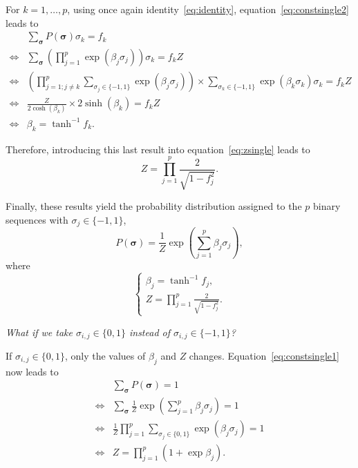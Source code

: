 \documentclass[12pt]{article}
\begin{document}
  For $k = 1, \dots, p$, using once again identity~\eqref{eq:identity},
  equation~\eqref{eq:constsingle2} leads to
  \begin{equation}
    \begin{split}
      &\sum_{\bm{\sigma}} P(\bm{\sigma}) \sigma_k = f_k\\
      \iff& \sum_{\bm{\sigma}} \left(\prod_{j = 1}^p\exp(\beta_j
        \sigma_j)\right) \sigma_k = f_k Z\\
      \iff& \left(\prod_{j = 1; j\neq k}^p \sum_{\sigma_j\in\{-1, 1\}}
        \exp(\beta_j \sigma_j)\right) \times \sum_{\sigma_k\in\{-1, 1\}}
        \exp(\beta_k \sigma_k) \sigma_k = f_k Z\\
      \iff& \frac{Z}{2 \cosh(\beta_k)} \times 2 \sinh(\beta_k) = f_k Z\\
      \iff& \beta_k = \tanh^{-1} f_k.
    \end{split}
  \end{equation}

  Therefore, introducing this last result into equation~\eqref{eq:zsingle}
  leads to
  \begin{equation}
    Z = \prod_{j = 1}^p \frac{2}{\sqrt{1 - f_j^2}}.
  \end{equation}

  Finally, these results yield the probability distribution assigned to the $p$
  binary sequences with $\sigma_j\in\{-1, 1\}$,
  \begin{equation}\label{eq:probasingle}
    P(\bm{\sigma}) = \frac{1}{Z}\exp\left(\sum_{j = 1}^p \beta_j
      \sigma_j\right),
  \end{equation}
  where
  \begin{equation}
    \begin{cases}
      \beta_j = \tanh^{-1} f_j,\\[1em]
      Z = \displaystyle\prod_{j = 1}^p \frac{2}{\sqrt{1 - f_j^2}}.
    \end{cases}
  \end{equation}

  \begin{displayquote}
    \itshape{}
    What if we take $\sigma_{i, j} \in \{0, 1\}$ instead of $\sigma_{i, j} \in
    \{-1, 1\}$?
  \end{displayquote}

  If $\sigma_{i, j} \in \{0, 1\}$, only the values of $\beta_j$ and $Z$
  changes. Equation~\eqref{eq:constsingle1} now leads to
  \begin{equation}\label{eq:zsingle2}
    \begin{split}
      &\sum_{\bm{\sigma}} P(\bm{\sigma}) = 1\\
      \iff& \sum_{\bm{\sigma}} \frac{1}{Z} \exp\left(\sum_{j = 1}^p \beta_j
        \sigma_j\right) = 1\\
      \iff& \frac{1}{Z} \prod_{j = 1}^p \sum_{\sigma_j\in\{0, 1\}} \exp(\beta_j
        \sigma_j) = 1\\
      \iff& Z = \prod_{j = 1}^p (1 + \exp\beta_j).
    \end{split}
  \end{equation}
\end{document}
